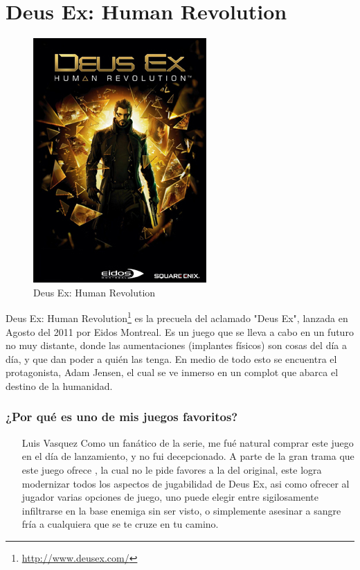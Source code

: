 \section{Deus Ex: Human Revolution}

\begin{figure}[htbp]
\begin{center}
\includegraphics[width=.60\textwidth]{./imagenes/deusex.jpg}
\caption{Deus Ex: Human Revolution}
\label{Deus Ex: Human Revolution}
\end{center}
\end{figure}
Deus Ex: Human Revolution\footnote{\url{http://www.deusex.com/}}  es la precuela del aclamado "Deus Ex", lanzada en Agosto del 2011 por Eidos Montreal. Es un juego que se lleva a cabo en un futuro no muy distante, donde las aumentaciones (implantes físicos) son cosas del día a día, y que dan poder a quién las tenga.
En medio de todo esto se encuentra el protagonista, Adam Jensen, el cual se ve inmerso en un complot que abarca el destino de la humanidad.

\subsubsection{¿Por qué es uno de mis juegos favoritos?}
\begin{itemize}
\item[Luis Vasquez] Como un fanático de la serie, me fué natural comprar este juego en el día de lanzamiento, y no fui decepcionado. A parte de la gran trama que este juego ofrece , la cual no le pide favores a la del original, este logra modernizar todos los aspectos de jugabilidad
de  Deus Ex, asi como ofrecer al jugador varias opciones de juego, uno puede elegir entre sigilosamente infiltrarse en la base enemiga sin ser visto, o simplemente asesinar a sangre fría a cualquiera que se te cruze en tu camino.
\end{itemize}
